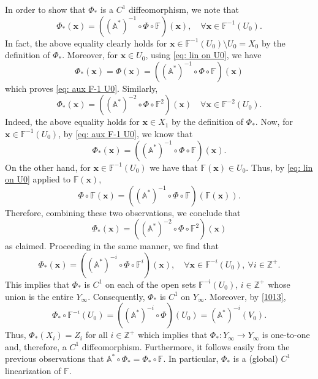 \documentclass[reqno, a4paper, 10pt]{amsart}
\theoremstyle{plain}
\numberwithin{equation}{section}
\theoremstyle{remark}
\def\Z{\mathbb{Z}}
\begin{document}
In order to show that $\Phi_*$ is a $C^1$ diffeomorphism, we note that 
\begin{equation}\label{eq: aux F-1 U0}
\Phi_*(\mathbf x)=((\mathbb A^\ast)^{-1}\circ \Phi \circ \mathbb F) (\mathbf x), \quad \forall \mathbf x\in \mathbb F^{-1}(U_0).
\end{equation}
In fact, the above equality clearly holds for $\mathbf x\in \mathbb F^{-1}(U_0)\setminus U_0=X_0$ by the definition of $\Phi_*$. Moreover, for $\mathbf x\in U_0$, using \eqref{eq: lin on U0}, we have
\[
\Phi_*(\mathbf x)=\Phi(\mathbf x)=((\mathbb A^\ast)^{-1}\circ \Phi \circ \mathbb F)(\mathbf x)
\]
which proves \eqref{eq: aux F-1 U0}.
Similarly,
\[
\Phi_*(\mathbf x)=((\mathbb A^\ast)^{-2}\circ \Phi \circ \mathbb F^2) (\mathbf x) \quad \forall \mathbf x\in \mathbb F^{-2}(U_0).
\]
Indeed, the above equality holds for $\mathbf x\in X_1$ by the definition of $\Phi_*$. Now, for $\mathbf x\in \mathbb F^{-1}(U_0)$, by \eqref{eq: aux F-1 U0}, we know that
\[
\Phi_*(\mathbf x)=((\mathbb A^\ast)^{-1}\circ \Phi \circ \mathbb F)(\mathbf x).
\]
On the other hand, for $\mathbf x\in \mathbb F^{-1}(U_0)$ we have that $\mathbb F(\mathbf x)\in U_0$. Thus, by \eqref{eq: lin on U0} applied to $\mathbb F(\mathbf{x})$,
\[\Phi\circ \mathbb F(\mathbf x)=((\mathbb A^\ast)^{-1}\circ \Phi \circ \mathbb F)(\mathbb F(\mathbf x)).\]
Therefore, combining these two observations, we conclude that
\[
\Phi_*(\mathbf x)=((\mathbb A^\ast)^{-2}\circ \Phi \circ \mathbb F^2)(\mathbf x)
\] 
as claimed.
Proceeding in the same manner, we find that 
\begin{equation}\label{1013}
\Phi_*(\mathbf x)=((\mathbb A^\ast)^{-i}\circ \Phi \circ \mathbb F^i)(\mathbf x), \quad \forall \mathbf x\in \mathbb F^{-i}(U_0), \ \forall i\in \Z^+ .
\end{equation}
This implies that $\Phi_*$ is $C^1$ on each of the open sets 
$\mathbb F^{-i}(U_0)$, $i\in \Z^+$ whose union is the entire $Y_\infty$. Consequently, $\Phi_*$ is $C^1$ on $Y_\infty$. Moreover, by \eqref{1013}, 
\[
\Phi_*\circ \mathbb{F}^{-i}(U_0)= ((\mathbb A^\ast)^{-i}\circ \Phi)(U_0)= (\mathbb A^\ast)^{-i}(V_0).
\]
Thus, $\Phi_*(X_i)=Z_i$ for all $i\in \Z^+$ which implies that $\Phi_*\colon Y_\infty\to Y_\infty$ is one-to-one and, therefore, a $C^1$ diffeomorphism. Furthermore, it follows easily from the previous observations that $\mathbb A^\ast \circ \Phi_\ast =\Phi_\ast \circ \mathbb F$. In particular, $\Phi_\ast$ is a (global) $C^1$ linearization of $\mathbb F$.
\end{document}
